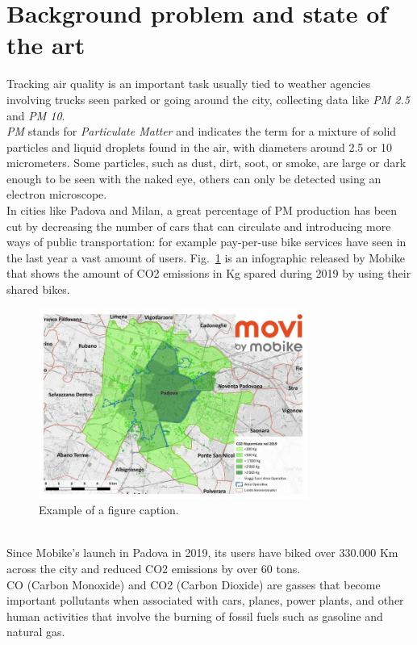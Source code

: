 \documentclass[conference]{IEEEtran}
\begin{document}
\section{Background problem and state of the art}\label{bck}
	Tracking air quality is an important task usually tied to weather agencies involving trucks seen parked or going around the city, collecting data like \textit{PM 2.5} and \textit{PM 10}.\\
	\textit{PM} stands for \textit{Particulate Matter} and indicates the term for a mixture of solid particles and liquid droplets found in the air, with diameters around 2.5 or 10 micrometers.
	Some particles, such as dust, dirt, soot, or smoke, are large or dark enough to be seen with the naked eye, others can only be detected using an electron microscope\cite{particles}.\\
	In cities like Padova and Milan\cite{milano}, a great percentage of PM production has been cut by decreasing the number of cars that can circulate and introducing more ways of public transportation: for example pay-per-use bike services have seen in the last year a vast amount of users.
	Fig.~\ref{mobi} is an infographic released by Mobike that shows the amount of CO2 emissions in Kg spared during 2019 by using their shared bikes.
	\begin{figure}[htbp]
		\centerline{\includegraphics[width=8.8cm]{fig3.jpg}}
		\caption{Example of a figure caption.\cite{mobike_pd}}
		\label{mobi}
	\end{figure}\\
	Since Mobike's launch in Padova in 2019, its users have biked over 330.000 Km across the city and reduced CO{\footnotesize 2} emissions by over 60 tons.\\
	CO (Carbon Monoxide) and CO{\footnotesize 2} (Carbon Dioxide) are gasses that become important pollutants when associated with cars, planes, power plants, and other human activities that involve the burning of fossil fuels such as gasoline and natural gas\cite{co2}.\\
\end{document}

